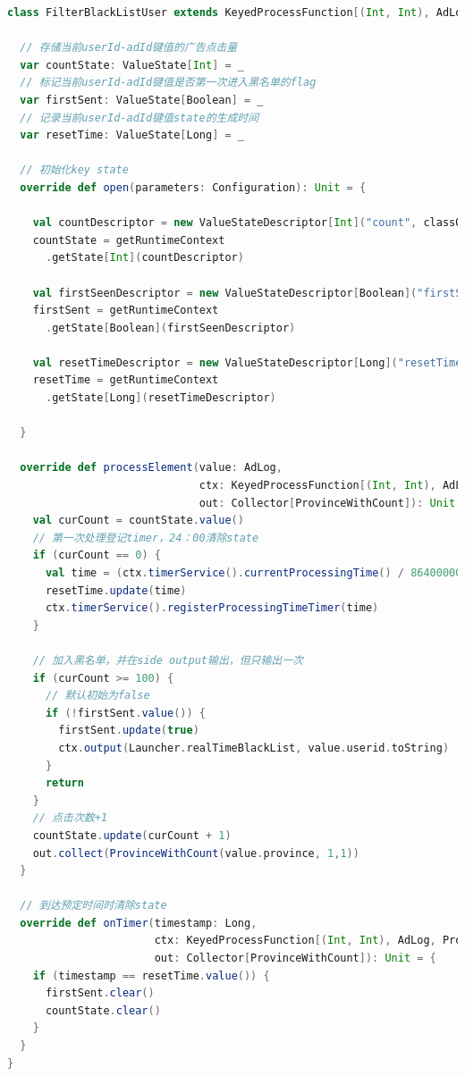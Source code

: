 \documentclass[oneside]{ctexbook}
\begin{document}
\begin{lstlisting}[language=scala]
class FilterBlackListUser extends KeyedProcessFunction[(Int, Int), AdLog, ProvinceWithCount] {

  // 存储当前userId-adId键值的广告点击量
  var countState: ValueState[Int] = _
  // 标记当前userId-adId键值是否第一次进入黑名单的flag
  var firstSent: ValueState[Boolean] = _
  // 记录当前userId-adId键值state的生成时间
  var resetTime: ValueState[Long] = _

  // 初始化key state
  override def open(parameters: Configuration): Unit = {

    val countDescriptor = new ValueStateDescriptor[Int]("count", classOf[Int])
    countState = getRuntimeContext
      .getState[Int](countDescriptor)

    val firstSeenDescriptor = new ValueStateDescriptor[Boolean]("firstSent", classOf[Boolean])
    firstSent = getRuntimeContext
      .getState[Boolean](firstSeenDescriptor)

    val resetTimeDescriptor = new ValueStateDescriptor[Long]("resetTime", classOf[Long])
    resetTime = getRuntimeContext
      .getState[Long](resetTimeDescriptor)

  }

  override def processElement(value: AdLog,
                              ctx: KeyedProcessFunction[(Int, Int), AdLog, ProvinceWithCount]#Context,
                              out: Collector[ProvinceWithCount]): Unit = {
    val curCount = countState.value()
    // 第一次处理登记timer，24：00清除state
    if (curCount == 0) {
      val time = (ctx.timerService().currentProcessingTime() / 86400000 + 1) * 86400000
      resetTime.update(time)
      ctx.timerService().registerProcessingTimeTimer(time)
    }

    // 加入黑名单，并在side output输出，但只输出一次
    if (curCount >= 100) {
      // 默认初始为false
      if (!firstSent.value()) {
        firstSent.update(true)
        ctx.output(Launcher.realTimeBlackList, value.userid.toString)
      }
      return
    }
    // 点击次数+1
    countState.update(curCount + 1)
    out.collect(ProvinceWithCount(value.province, 1,1))
  }

  // 到达预定时间时清除state
  override def onTimer(timestamp: Long,
                       ctx: KeyedProcessFunction[(Int, Int), AdLog, ProvinceWithCount]#OnTimerContext,
                       out: Collector[ProvinceWithCount]): Unit = {
    if (timestamp == resetTime.value()) {
      firstSent.clear()
      countState.clear()
    }
  }
}
\end{lstlisting}
\end{document}
